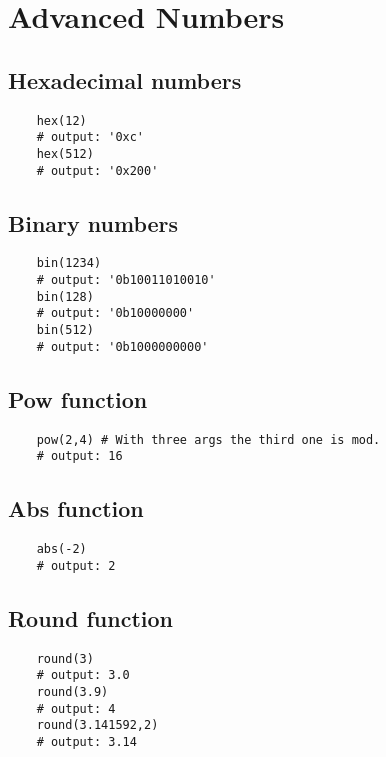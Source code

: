 \section{Advanced Numbers}
\subsection{Hexadecimal numbers}
\begin{verbatim}
    hex(12)
    # output: '0xc'
    hex(512)
    # output: '0x200'
\end{verbatim}

\subsection{Binary numbers}
\begin{verbatim}
    bin(1234)
    # output: '0b10011010010'
    bin(128)
    # output: '0b10000000'
    bin(512)
    # output: '0b1000000000'
\end{verbatim}

\subsection{Pow function }
\begin{verbatim}
    pow(2,4) # With three args the third one is mod. 
    # output: 16
\end{verbatim}


\subsection{Abs function}
\begin{verbatim}
    abs(-2)
    # output: 2
\end{verbatim}


\subsection{Round function}
\begin{verbatim}
    round(3)
    # output: 3.0
    round(3.9)
    # output: 4
    round(3.141592,2)
    # output: 3.14
\end{verbatim}


